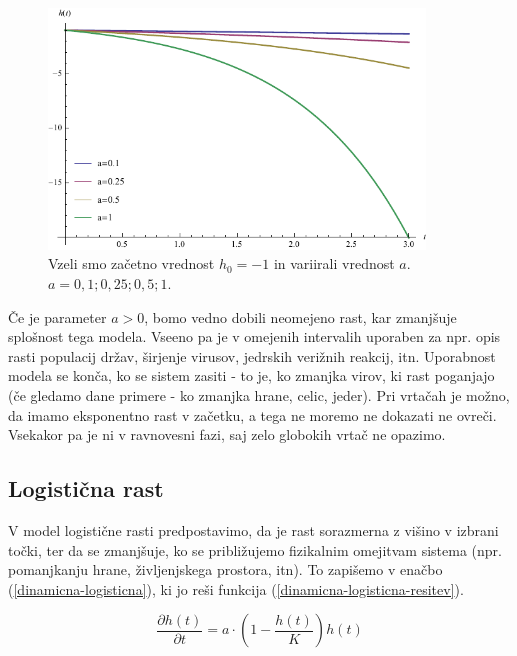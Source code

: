 \documentclass[a4paper, twoside, 12pt]{book}
\begin{document}
    \begin{figure}[h]
      \begin{center}
        \includegraphics[width=10cm]{slike/eksponentna-rast}
      \end{center}
      \caption{Vzeli smo začetno vrednost $h_0 = -1$ in variirali vrednost $a$. \newline $a=0,1;0,25;0,5;1$.}
      \label{fig:eksponentna-rast}
    \end{figure}

    Če je parameter $a > 0$, bomo vedno dobili neomejeno rast, kar zmanjšuje splošnost tega modela. Vseeno pa je v omejenih intervalih uporaben za npr. opis rasti populacij držav, širjenje virusov, jedrskih verižnih reakcij, itn. Uporabnost modela se konča, ko se sistem zasiti - to je, ko zmanjka virov, ki rast poganjajo (če gledamo dane primere - ko zmanjka hrane, celic, jeder).
    Pri vrtačah je možno, da imamo eksponentno rast v začetku, a tega ne moremo ne dokazati ne ovreči. Vsekakor pa je ni v ravnovesni fazi, saj zelo globokih vrtač ne opazimo.


    \subsection{Logistična rast}

    V model logistične rasti predpostavimo, da je rast sorazmerna z višino v izbrani točki, ter da se zmanjšuje, ko se približujemo fizikalnim omejitvam sistema (npr. pomanjkanju hrane, življenjskega prostora, itn). To zapišemo v enačbo (\ref{dinamicna-logisticna}), ki jo reši funkcija (\ref{dinamicna-logisticna-resitev}).

    \begin{equation}
      \frac{\partial h(t)}{\partial t} = a \cdot \left( 1 - \frac{h(t)}{K} \right) h(t)
      \label{dinamicna-logisticna}
    \end{equation}
\end{document}
